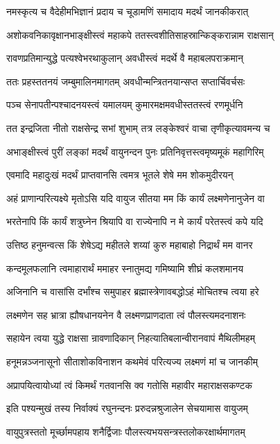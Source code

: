 \twolineshloka
{नमस्कृत्य च वैदेहीमभिज्ञानं प्रदाय च}
{चूडामणिं समादाय मदर्थं जानकीकरात्}%

\twolineshloka
{अशोकवनिकावृक्षानभाङ्क्षीस्त्वं महाकपे}
{ततस्त्वशीतिसाहस्रान्किङ्करान्नाम राक्षसान्}%

\twolineshloka
{रावणप्रतिमान्युद्धे पत्यश्वेभरथाकुलान्}
{अवधीस्त्वं मदर्थे वै महाबलपराक्रमान्}%

\twolineshloka
{ततः प्रहस्ततनयं जम्बुमालिनमागतम्}
{अवधीन्मन्त्रितनयान्सप्त सप्तार्चिवर्चसः}%

\twolineshloka
{पञ्च सेनापतीन्पश्चादनयस्त्वं यमालयम्}
{कुमारमक्षमवधीस्ततस्त्वं रणमूर्धनि}%

\twolineshloka
{तत इन्द्रजिता नीतो राक्षसेन्द्र सभां शुभाम्}
{तत्र लङ्केश्वरं वाचा तृणीकृत्यावमन्य च}%

\twolineshloka
{अभाङ्क्षीस्त्वं पुरीं लङ्कां मदर्थं वायुनन्दन}
{पुनः प्रतिनिवृत्तस्त्वमृष्यमूकं महागिरिम्}%

\twolineshloka
{एवमादि महादुःखं मदर्थं प्राप्तवानसि}
{त्वमत्र भूतले शेषे मम शोकमुदीरयन्}%

\twolineshloka
{अहं प्राणान्परित्यक्ष्ये मृतोऽसि यदि वायुज}
{सीतया मम किं कार्यं लक्ष्मणेनानुजेन वा}%

\twolineshloka
{भरतेनापि किं कार्यं शत्रुघ्नेन श्रियापि वा}
{राज्येनापि न मे कार्यं परेतस्त्वं कपे यदि}%

\twolineshloka
{उत्तिष्ठ हनुमन्वत्स किं शेषेऽद्य महीतले}
{शय्यां कुरु महाबाहो निद्रार्थं मम वानर}%

\twolineshloka
{कन्दमूलफलानि त्वमाहारार्थं ममाहर}
{स्नातुमद्य गमिष्यामि शीघ्रं कलशमानय}%

\twolineshloka
{अजिनानि च वासांसि दर्भांश्च समुपाहर}
{ब्रह्मास्त्रेणावबद्धोऽहं मोचितश्च त्वया हरे}%

\twolineshloka
{लक्ष्मणेन सह भ्रात्रा ह्यौषधानयनेन वै}
{लक्ष्मणप्राणदाता त्वं पौलस्त्यमदनाशनः}%

\twolineshloka
{सहायेन त्वया युद्धे राक्षसा न्रावणादिकान्}
{निहत्यातिबलान्वीरानवापं मैथिलीमहम्}%

\twolineshloka
{हनूमन्नञ्जनासूनो सीताशोकविनाशन}
{कथमेवं परित्यज्य लक्ष्मणं मां च जानकीम्}%

\twolineshloka
{अप्रापयित्वायोध्यां त्वं किमर्थं गतवानसि}
{क्व गतोसि महावीर महाराक्षसकण्टक}%

\twolineshloka
{इति पश्यन्मुखं तस्य निर्वाक्यं रघुनन्दनः}
{प्ररुदन्नश्रुजालेन सेचयामास वायुजम्}%

\twolineshloka
{वायुपुत्रस्ततो मूर्च्छामपहाय शनैर्द्विजाः}
{पौलस्त्यभयसन्त्रस्तलोकरक्षार्थमागतम्}%

